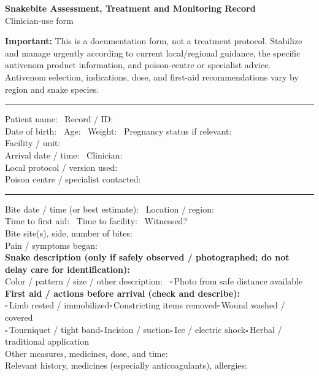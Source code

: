 \documentclass[10pt,a4paper]{article}
\newcommand{\boxx}{\ensuremath{\square}}
\newcommand{\checkitem}[1]{\boxx\,#1\quad}
\newcommand{\linefield}[2]{#1\ \underline{\hspace{#2}}}
\newcommand{\sectionbar}[1]{\vspace{3pt}{\large\bfseries #1}\par\vspace{1pt}\hrule\vspace{3pt}}
\begin{document}
\begin{center}
  {\LARGE\bfseries Snakebite Assessment, Treatment and Monitoring Record}\\[-1pt]
  {\large Clinician-use form}
\end{center}
\small
\textbf{Important:} This is a documentation form, not a treatment protocol. Stabilize and manage urgently according to current local/regional guidance, the specific antivenom product information, and poison-centre or specialist advice. Antivenom selection, indications, dose, and first-aid recommendations vary by region and snake species.

\sectionbar{1. Patient and encounter}
\linefield{Patient name:}{6.6cm} \linefield{Record / ID:}{3.4cm}\\
\linefield{Date of birth:}{3.0cm} \linefield{Age:}{1.5cm} \linefield{Weight:}{2.0cm} \linefield{Pregnancy status if relevant:}{3.2cm}\\
\linefield{Facility / unit:}{8.0cm}\\
\linefield{Arrival date / time:}{4.0cm} \linefield{Clinician:}{4.5cm}\\
\linefield{Local protocol / version used:}{6.5cm}\\
\linefield{Poison centre / specialist contacted:}{7.5cm}

\sectionbar{2. Bite and pre-hospital history}
\linefield{Bite date / time (or best estimate):}{5.5cm} \linefield{Location / region:}{4.8cm}\\
\linefield{Time to first aid:}{2.8cm} \linefield{Time to facility:}{3.0cm} \linefield{Witnessed?}{1.0cm}\\
\linefield{Bite site(s), side, number of bites:}{7.0cm}\\
\linefield{Pain / symptoms began:}{6.0cm}\\
\textbf{Snake description (only if safely observed / photographed; do not delay care for identification):}\\
\linefield{Color / pattern / size / other description:}{6.5cm} \checkitem{Photo from safe distance available}\\
\textbf{First aid / actions before arrival (check and describe):}\\
\checkitem{Limb rested / immobilized}\checkitem{Constricting items removed}\checkitem{Wound washed / covered}\\
\checkitem{Tourniquet / tight band}\checkitem{Incision / suction}\checkitem{Ice / electric shock}\checkitem{Herbal / traditional application}\\
\linefield{Other measures, medicines, dose, and time:}{6.0cm}\\
\linefield{Relevant history, medicines (especially anticoagulants), allergies:}{4.2cm}
\end{document}
